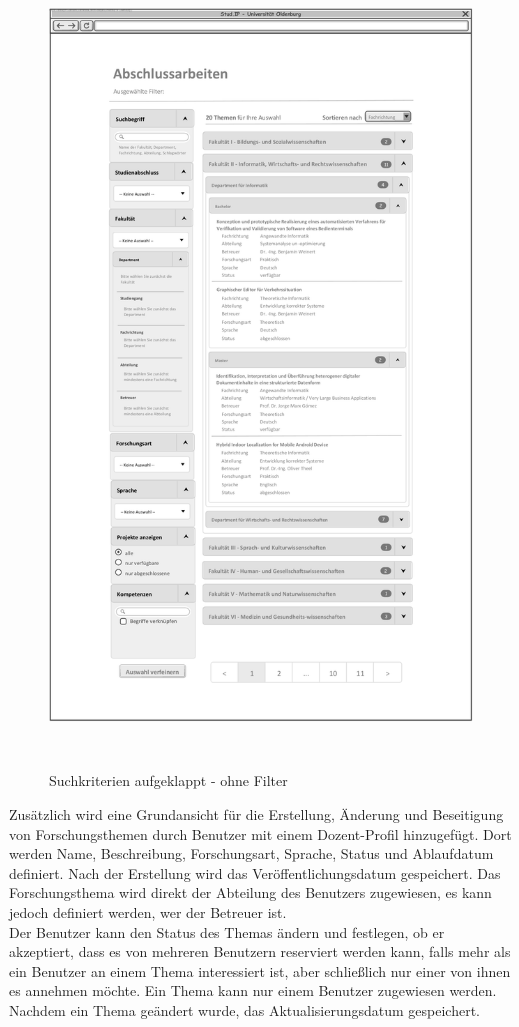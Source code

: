 \cleardoublepage
\begin{figure}[hp]%
    \centering
    \includegraphics[height=20.5cm,keepaspectratio]{pics/app_expanded}\\
    \caption{Suchkriterien aufgeklappt - ohne Filter}
\end{figure}

\cleardoublepage
Zusätzlich wird eine Grundansicht für die Erstellung, Änderung und Beseitigung von Forschungsthemen durch Benutzer mit einem Dozent-Profil hinzugefügt. Dort werden Name, Beschreibung, Forschungsart, Sprache, Status und Ablaufdatum definiert. Nach der Erstellung wird das Veröffentlichungsdatum gespeichert.
Das Forschungsthema wird direkt der Abteilung des Benutzers zugewiesen, es kann jedoch definiert werden, wer der Betreuer ist.\\

Der Benutzer kann den Status des Themas ändern und festlegen, ob er akzeptiert, dass es von mehreren Benutzern reserviert werden kann, falls mehr als ein Benutzer an einem Thema interessiert ist, aber schließlich nur einer von ihnen es annehmen möchte. Ein Thema kann nur einem Benutzer zugewiesen werden.
Nachdem ein Thema geändert wurde, das Aktualisierungsdatum gespeichert.
